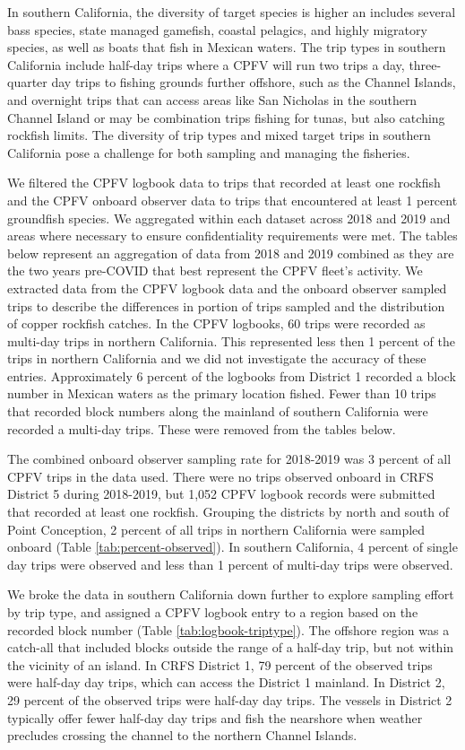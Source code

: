 \documentclass[11pt,
  english,
  letterpaper,
]{article}
\begin{document}
In southern California, the diversity of target species is higher an includes several bass species, state managed gamefish, coastal pelagics, and highly migratory species, as well as boats that fish in Mexican waters. The trip types in southern California include half-day trips where a CPFV will run two trips a day, three-quarter day trips to fishing grounds further offshore, such as the Channel Islands, and overnight trips that can access areas like San Nicholas in the southern Channel Island or may be combination trips fishing for tunas, but also catching rockfish limits. The diversity of trip types and mixed target trips in southern California pose a challenge for both sampling and managing the fisheries.

We filtered the CPFV logbook data to trips that recorded at least one rockfish and the CPFV onboard observer data to trips that encountered at least 1 percent groundfish species. We aggregated within each dataset across 2018 and 2019 and areas where necessary to ensure confidentiality requirements were met. The tables below represent an aggregation of data from 2018 and 2019 combined as they are the two years pre-COVID that best represent the CPFV fleet's activity. We extracted data from the CPFV logbook data and the onboard observer sampled trips to describe the differences in portion of trips sampled and the distribution of copper rockfish catches. In the CPFV logbooks, 60 trips were recorded as multi-day trips in northern California. This represented less then 1 percent of the trips in northern California and we did not investigate the accuracy of these entries. Approximately 6 percent of the logbooks from District 1 recorded a block number in Mexican waters as the primary location fished. Fewer than 10 trips that recorded block numbers along the mainland of southern California were recorded a multi-day trips. These were removed from the tables below.

The combined onboard observer sampling rate for 2018-2019 was 3 percent of all CPFV trips in the data used. There were no trips observed onboard in CRFS District 5 during 2018-2019, but 1,052 CPFV logbook records were submitted that recorded at least one rockfish. Grouping the districts by north and south of Point Conception, 2 percent of all trips in northern California were sampled onboard (Table \ref{tab:percent-observed}). In southern California, 4 percent of single day trips were observed and less than 1 percent of multi-day trips were observed.

We broke the data in southern California down further to explore sampling effort by trip type, and assigned a CPFV logbook entry to a region based on the recorded block number (Table \ref{tab:logbook-triptype}). The offshore region was a catch-all that included blocks outside the range of a half-day trip, but not within the vicinity of an island. In CRFS District 1, 79 percent of the observed trips were half-day day trips, which can access the District 1 mainland. In District 2, 29 percent of the observed trips were half-day day trips. The vessels in District 2 typically offer fewer half-day day trips and fish the nearshore when weather precludes crossing the channel to the northern Channel Islands.
\end{document}
